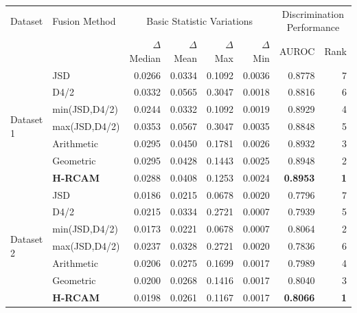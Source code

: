 \begin{tabular}{llrrrrrr}
\toprule
Dataset & Fusion Method & \multicolumn{4}{c}{Basic Statistic Variations} & \multicolumn{2}{c}{Discrimination Performance} \\
\cmidrule(lr){3-6}\cmidrule(lr){7-8}
& & $\Delta$ Median & $\Delta$ Mean & $\Delta$ Max & $\Delta$ Min & AUROC & Rank \\
\midrule
\multirow{7}{*}{Dataset 1} & JSD & 0.0266 & 0.0334 & 0.1092 & 0.0036 & 0.8778 & 7 \\
 & D4/2 & 0.0332 & 0.0565 & 0.3047 & 0.0018 & 0.8816 & 6 \\
 & min(JSD,D4/2) & 0.0244 & 0.0332 & 0.1092 & 0.0019 & 0.8929 & 4 \\
 & max(JSD,D4/2) & 0.0353 & 0.0567 & 0.3047 & 0.0035 & 0.8848 & 5 \\
 & Arithmetic & 0.0295 & 0.0450 & 0.1781 & 0.0026 & 0.8932 & 3 \\
 & Geometric & 0.0295 & 0.0428 & 0.1443 & 0.0025 & 0.8948 & 2 \\
 & \textbf{H-RCAM} & 0.0288 & 0.0408 & 0.1253 & 0.0024 & \textbf{0.8953} & \textbf{1} \\
\midrule
\multirow{7}{*}{Dataset 2} & JSD & 0.0186 & 0.0215 & 0.0678 & 0.0020 & 0.7796 & 7 \\
 & D4/2 & 0.0215 & 0.0334 & 0.2721 & 0.0007 & 0.7939 & 5 \\
 & min(JSD,D4/2) & 0.0173 & 0.0221 & 0.0678 & 0.0007 & 0.8064 & 2 \\
 & max(JSD,D4/2) & 0.0237 & 0.0328 & 0.2721 & 0.0020 & 0.7836 & 6 \\
 & Arithmetic & 0.0206 & 0.0275 & 0.1699 & 0.0017 & 0.7989 & 4 \\
 & Geometric & 0.0200 & 0.0268 & 0.1416 & 0.0017 & 0.8040 & 3 \\
 & \textbf{H-RCAM} & 0.0198 & 0.0261 & 0.1167 & 0.0017 & \textbf{0.8066} & \textbf{1} \\
\bottomrule
\end{tabular}
